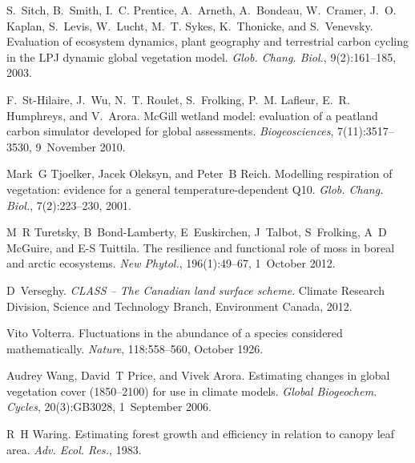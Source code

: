 \begin{DoxyDescription}
\item[\label{_CITEREF_Sitch2003-847}%
\mbox{[}54\mbox{]}]S.~Sitch, B.~Smith, I.~C. Prentice, A.~Arneth, A.~Bondeau, W.~Cramer, J.~O. Kaplan, S.~Levis, W.~Lucht, M.~T. Sykes, K.~Thonicke, and S.~Venevsky. Evaluation of ecosystem dynamics, plant geography and terrestrial carbon cycling in the L\+P\+J dynamic global vegetation model. {\itshape Glob. Chang. Biol.}, 9(2)\+:161--185, 2003. 


\item[\label{_CITEREF_St-Hilaire2010-5e9}%
\mbox{[}55\mbox{]}]F.~St-\/\+Hilaire, J.~Wu, N.~T. Roulet, S.~Frolking, P.~M. Lafleur, E.~R. Humphreys, and V.~Arora. Mc\+Gill wetland model\+: evaluation of a peatland carbon simulator developed for global assessments. {\itshape Biogeosciences}, 7(11)\+:3517--3530, 9~November 2010. 


\item[\label{_CITEREF_Tjoelker2001-uz}%
\mbox{[}56\mbox{]}]Mark~G Tjoelker, Jacek Oleksyn, and Peter~B Reich. Modelling respiration of vegetation\+: evidence for a general temperature-\/dependent Q10. {\itshape Glob. Chang. Biol.}, 7(2)\+:223--230, 2001.


\item[\label{_CITEREF_Turetsky2012-qh}%
\mbox{[}57\mbox{]}]M~R Turetsky, B~Bond-\/\+Lamberty, E~Euskirchen, J~Talbot, S~Frolking, A~D Mc\+Guire, and E-\/\+S Tuittila. The resilience and functional role of moss in boreal and arctic ecosystems. {\itshape New Phytol.}, 196(1)\+:49--67, 1~October 2012. 


\item[\label{_CITEREF_Verseghy2012-c0e}%
\mbox{[}58\mbox{]}]D~Verseghy. {\itshape C\+L\+A\+S\+S -- The Canadian land surface scheme}. Climate Research Division, Science and Technology Branch, Environment Canada, 2012.


\item[\label{_CITEREF_Volterra1926-iz}%
\mbox{[}59\mbox{]}]Vito Volterra. Fluctuations in the abundance of a species considered mathematically. {\itshape Nature}, 118\+:558--560, October 1926. 


\item[\label{_CITEREF_Wang2006-he}%
\mbox{[}60\mbox{]}]Audrey Wang, David~T Price, and Vivek Arora. Estimating changes in global vegetation cover (1850–2100) for use in climate models. {\itshape Global Biogeochem. Cycles}, 20(3)\+:G\+B3028, 1~September 2006. 


\item[\label{_CITEREF_Waring1983-wc}%
\mbox{[}61\mbox{]}]R~H Waring. Estimating forest growth and efficiency in relation to canopy leaf area. {\itshape Adv. Ecol. Res.}, 1983. 



\end{DoxyDescription}
